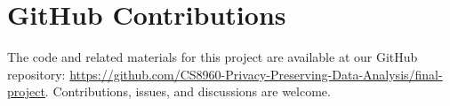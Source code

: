 \documentclass{article}
\begin{document}
    
    


    \section*{GitHub Contributions}
    The code and related materials for this project are available at our GitHub repository:
    \url{https://github.com/CS8960-Privacy-Preserving-Data-Analysis/final-project}.
    Contributions, issues, and discussions are welcome.
\end{document}
